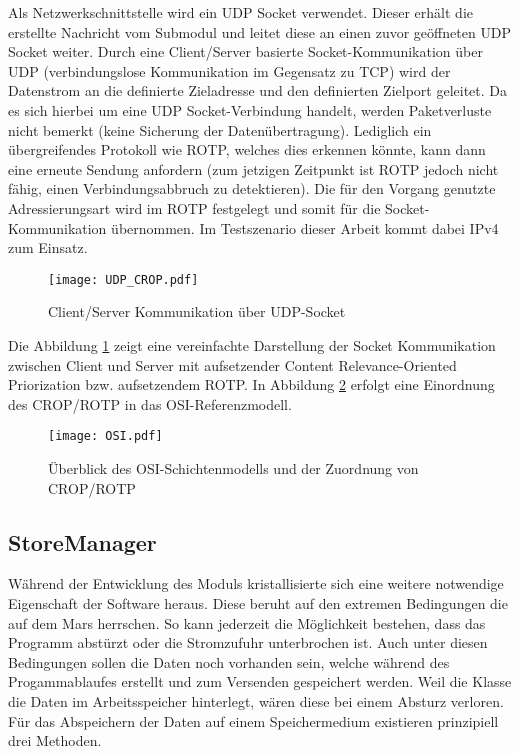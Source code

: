 Als Netzwerkschnittstelle wird ein \gls{UDP} Socket verwendet. Dieser erh{\"a}lt die
erstellte Nachricht vom Submodul  und leitet diese an einen
zuvor ge{\"o}ffneten \gls{UDP} Socket weiter. Durch eine Client/Server basierte
Socket-Kommunikation {\"u}ber \gls{UDP} (verbindungslose Kommunikation im Gegensatz
zu \gls{TCP}) wird der Datenstrom an die definierte Zieladresse und den
definierten Zielport geleitet. Da es sich hierbei um eine \gls{UDP} Socket-Verbindung handelt,
werden Paketverluste nicht bemerkt (keine Sicherung der Daten{\"u}bertragung).
Lediglich ein {\"u}bergreifendes Protokoll wie \gls{ROTP}, welches dies erkennen
k{\"o}nnte, kann dann eine erneute Sendung anfordern (zum jetzigen Zeitpunkt
ist \gls{ROTP} jedoch nicht f{\"a}hig, einen Verbindungsabbruch zu detektieren).
Die f{\"u}r den Vorgang genutzte Adressierungsart wird im \gls{ROTP} festgelegt
und somit f{\"u}r die Socket-Kommunikation {\"u}bernommen. Im Testszenario
dieser Arbeit kommt dabei IPv4 zum Einsatz.

\begin{figure}[H]
	\centering
	\texttt{[image: UDP\_CROP.pdf]}
	\caption{Client/Server Kommunikation {\"u}ber UDP-Socket}
	\label{fig:Socket-Kommunikation}
\end{figure}

Die Abbildung \ref{fig:Socket-Kommunikation} zeigt eine vereinfachte Darstellung
der Socket Kommunikation zwischen Client und Server mit aufsetzender Content
Relevance-Oriented Priorization bzw. aufsetzendem \gls{ROTP}. In Abbildung
\ref{fig:OSI} erfolgt eine Einordnung des \gls{CROP}/\gls{ROTP} in das OSI-Referenzmodell.

\begin{figure}[H]
	\centering
	\texttt{[image: OSI.pdf]}
	\caption{{\"U}berblick des OSI-Schichtenmodells und der Zuordnung von CROP/ROTP}
	\label{fig:OSI}
\end{figure}

\subsection{StoreManager}

W{\"a}hrend der Entwicklung des Moduls  kristallisierte sich eine
weitere notwendige Eigenschaft der Software heraus. Diese beruht auf den
extremen Bedingungen die auf dem Mars herrschen. So kann jederzeit die
Möglichkeit bestehen, dass das Programm abstürzt oder die Stromzufuhr
unterbrochen ist. Auch unter diesen Bedingungen sollen die Daten noch vorhanden
sein, welche w{\"a}hrend des Progammablaufes erstellt und zum Versenden
gespeichert werden. Weil die Klasse 
die Daten im Arbeitsspeicher hinterlegt, w{\"a}ren diese bei einem Absturz verloren.
F{\"u}r das Abspeichern der Daten auf einem Speichermedium existieren
prinzipiell drei Methoden.


